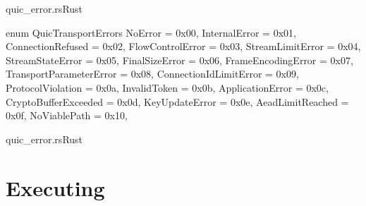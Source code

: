 \begin{codeblock}{quic\_error.rs}{Rust}
    \begin{rustcode}
        enum QuicTransportErrors {
            NoError = 0x00,
            InternalError = 0x01,
            ConnectionRefused = 0x02,
            FlowControlError = 0x03,
            StreamLimitError = 0x04,
            StreamStateError = 0x05,
            FinalSizeError = 0x06,
            FrameEncodingError = 0x07,
            TransportParameterError = 0x08,
            ConnectionIdLimitError = 0x09,
            ProtocolViolation = 0x0a,
            InvalidToken = 0x0b,
            ApplicationError = 0x0c,
            CryptoBufferExceeded = 0x0d,
            KeyUpdateError = 0x0e,
            AeadLimitReached = 0x0f,
            NoViablePath = 0x10,
        }
    \end{rustcode}
    \label{quic_errors}
\end{codeblock}

\begin{codeblock}{quic\_error.rs}{Rust}
    \label{quic_errors_self_defined}
\end{codeblock}

\section{Executing}

